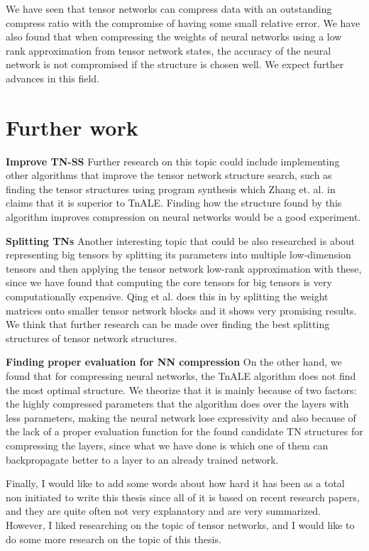 \documentclass[11pt,a4paper,openright,oneside]{book}
\numberwithin{equation}{section}
\begin{document}
{We have seen that tensor networks can compress data with an outstanding compress ratio with the compromise
of having some small relative error. We have also found that when compressing the weights of neural networks using a low rank approximation from
tensor network states, the accuracy of the neural network is not compromised if the structure is chosen well. 
We expect further advances in this field.

\section*{Further work}

\textbf{Improve TN-SS} Further research on this topic could include implementing other algorithms that improve
the tensor network structure search, such as finding the tensor structures using program synthesis which
Zhang et. al. in \cite{guoTensorNetworkStructure2025} claims that it is superior to \gls{TnALE}. Finding how the structure
found by this algorithm improves compression on neural networks would be a good experiment.

\textbf{Splitting TNs} Another interesting topic that could be also researched is about representing big tensors by splitting its parameters
into multiple low-dimension tensors and then applying the tensor network low-rank approximation with these, since
we have found that computing the core tensors for big tensors is very computationally expensive. Qing et al.
does this in \cite{qingCompressingNeuralNetworks2025} by splitting the weight matrices onto smaller tensor network blocks
and it shows very promising results.
We think that further research can be made over finding the best splitting structures of
tensor network structures.

\textbf{Finding proper evaluation for NN compression} On the other hand, we found that for compressing neural networks, the TnALE algorithm does not find the most optimal
structure. We theorize that it is mainly because of two factors: the highly compressed parameters that the algorithm does
over the layers with less parameters, making the neural network lose expressivity and also because of the 
lack of a proper evaluation function for the found candidate TN structures for compressing the layers, since
what we have done is which one of them can backpropagate better to a layer to an already trained network.

Finally, I would like to add some words about how hard it has been 
as a total non initiated to write this thesis since all of it is based
on recent research papers, and they are quite often not very explanatory and
are very summarized. However, I liked researching on the topic of tensor networks, and I would like
to do some more research on the topic of this thesis.

}
\end{document}
